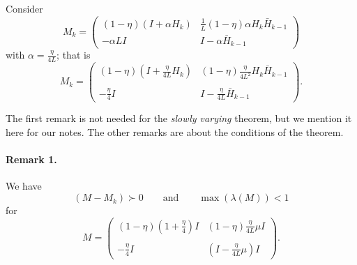 \documentclass{article}
\begin{document}
 
\noindent 
Consider
\[
 M_k = \begin{pmatrix} (1-\eta)(I+\alpha H_k) & \displaystyle\frac{1}{L} (1-\eta)\alpha H_k\bar H_{k-1}\\  
                   -\alpha LI  & I-\alpha\bar H_{k-1} \end{pmatrix}                  
\]
with $\alpha=\displaystyle\frac{\eta}{4L}$; that is
\[
 M_k = \begin{pmatrix} (1-\eta)(I+\displaystyle\frac{\eta}{4L} H_k) & (1-\eta)\displaystyle\frac{\eta}{4L^2} H_k\bar H_{k-1}\\  
 \\
                   -\displaystyle\frac{\eta}{4} I  & I-\displaystyle\frac{\eta}{4L}\bar H_{k-1} \end{pmatrix}.                  
\]


\bigskip
The first remark is not needed for the \emph{slowly varying} theorem, but we mention it here for our notes.  The other remarks are about the conditions of the theorem.

\bigskip
\noindent
\paragraph{Remark 1.} We have 
\[
 (M-M_k)\succ 0 \qquad \mbox{and} \qquad \max(\lambda(M))<1
\]
for
\[
 M = \begin{pmatrix} (1-\eta)(1+\displaystyle\frac{\eta}{4})I & (1-\eta)\displaystyle\frac{\eta}{4L} \mu I\\  
 \\
                   -\displaystyle\frac{\eta}{4} I  & (I-\displaystyle\frac{\eta}{4L}\mu) I \end{pmatrix}.                  
\]

\bigskip
\end{document}
